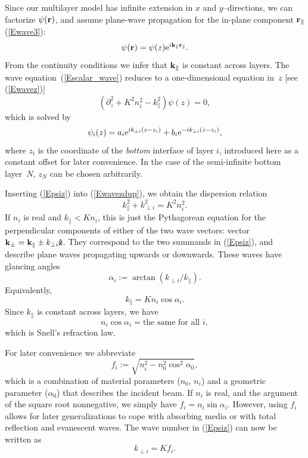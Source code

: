 Since our multilayer model has infinite extension
in $x$ and $y$--directions, we can factorize
$\psi(\mathbf{r})$, and assume plane-wave propagation for
the in-plane component $\mathbf{r}_\parallel$ (\ref{Ewave3}):
\begin{equation}\label{Ewave3dup}
\psi(\mathbf{r}) = \psi(z) {\rm e}^{i \mathbf{k}_\parallel\mathbf{r}_\parallel}.
\end{equation}
From the continuity conditions we infer that $\mathbf{k}_\parallel$
is constant across layers.
The wave equation~(\ref{Escalar_wave})
reduces to a one-dimensional equation in~$z$ [see (\ref{Ewavez})]
\begin{equation}\label{Ewavezdup}
\left(\partial_z^2 + K^2n_i^2 - k_\parallel^2 \right) \psi(z) = 0,
\end{equation}
which is solved by
\begin{equation}\label{Epsiz}
  \psi_i(z) = a_i{\rm e}^{ik_{\perp i}(z-z_i)} + b_i{\rm e}^{-ik_{\perp i}(z-z_i)},
\end{equation}
where $z_i$ is the coordinate of the \textit{bottom} interface
of layer $i$,
introduced here as a constant offset for later convenience.
In the case of the semi-infinite bottom layer~$N$,
$z_N$ can be chosen arbitrarily.

Inserting (\ref{Epsiz}) into (\ref{Ewavezdup}),
we obtain the dispersion relation
\begin{equation}\label{Edisp}
  k_\parallel^2 + k_{\perp i}^2 = K^2 n_i^2.   
\end{equation}
If $n_i$ is real and $k_\parallel<K n_i$,
this is just the Pythagorean equation
for the perpendicular components of either of
the two wave vectors:
vector $\mathbf{k}_\pm=\mathbf{k}_\parallel \pm k_{\perp i}\mathbf{\hat z}$.
They correspond to the two summands in (\ref{Epsiz}),
and describe plane waves propagating upwards or downwards.
These waves have glancing angles
\begin{equation}\label{Edef_alpha}
  \alpha_i:=\arctan(k_{\perp i}/k_\parallel).  
\end{equation}
Equivalently,
\begin{equation}
  k_\parallel=K n_i \cos\alpha_i. 
\end{equation}
Since $k_\parallel$ is constant across layers,
we have
\begin{equation}\label{ESnell}
  n_i \cos\alpha_i = \text{the same for all }i,
\end{equation}
which is Snell's refraction law.

For later convenience we abbreviate
\begin{equation}\label{Edef_f}
f_i := \sqrt{ n_i^2 - n_0^2 \cos^2\alpha_0 },
\end{equation}
which is a combination of material parameters ($n_0$, $n_i$)
and a geometric parameter ($\alpha_0$) that describes the incident beam.
If $n_i$ is real, and the argument of the square root nonnegative,
we simply have $f_i=n_i\sin\alpha_i$.
However, using $f_i$ allows for later generalizations
to cope with absorbing media or with total reflection and evanescent waves.
The wave number in (\ref{Epsiz}) can now be written as
\begin{equation}\label{EkKf}
  k_{\perp i} = K f_i.
\end{equation}


